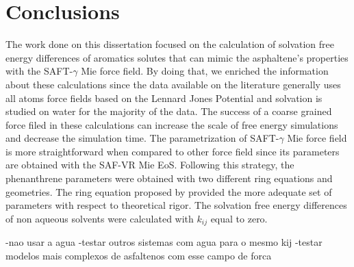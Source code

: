 \chapter{Conclusions} %

\label{Chapter6} %
The work done on this dissertation focused on the calculation of solvation free energy differences of aromatics solutes that can mimic the asphaltene's properties with the SAFT-$\gamma$ Mie force field. By doing that, we enriched the information about these calculations since the data available on the literature generally uses all atoms force fields based on the Lennard Jones Potential and solvation is studied on water for the majority of the data. The success of a coarse grained force filed in these calculations can increase the scale of free energy simulations and decrease the simulation time. The parametrization of SAFT-$\gamma$ Mie force field is more straightforward when compared to other force field since its parameters are obtained with the SAF-VR Mie EoS. Following this strategy, the phenanthrene parameters were obtained with two different ring equations and geometries. The ring equation proposed by  provided the more adequate set of parameters with respect to theoretical rigor. The solvation free energy differences of non aqueous solvents were calculated with $k_{ij}$ equal to zero.         

-nao usar a agua
-testar outros sistemas com agua para o mesmo kij
-testar modelos mais complexos de asfaltenos com esse campo de forca
